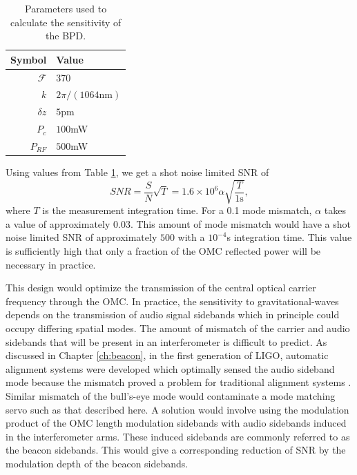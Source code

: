 \begin{table}
  \begin{center}
    \begin{tabular}{|r|l|}
      \hline
      Symbol & Value \\
      \hline
      $\mathcal{F}$ &  370\\
      $k$ &  $2\pi/(1064\text{nm})$\\
      $\delta z$ &  $5$pm\\
      $P_c$ &  $100$mW \\
      $P_{RF}$ &  $500$mW \\
      \hline
    \end{tabular}
  \caption{Parameters used to calculate the sensitivity of the BPD.}
  \label{tab:values}
  \end{center}
\end{table}

Using values from Table \ref{tab:values}, we get a shot noise limited SNR of
\begin{equation}
SNR =\frac{S}{N}\sqrt{T}= 1.6\times 10^6 \alpha \sqrt{\frac{T}{1\text{s}}},
\end{equation}
where $T$ is the measurement integration time. %
For a 0.1\perc{} mode mismatch, $\alpha$ takes a value of approximately $0.03$. %
This amount of mode mismatch would have a shot noise limited SNR of approximately $500$ with a $10^{-4}$s integration time. %
This value is sufficiently high that only a fraction of the OMC reflected power will be necessary in practice.

This design would optimize the transmission of the central optical carrier frequency through the OMC. %
In practice, the sensitivity to gravitational-waves depends on the transmission of audio signal sidebands which in principle could occupy differing spatial modes. %
The amount of mismatch of the carrier and audio sidebands that will be present in an interferometer is difficult to predict. %
As discussed in Chapter \ref{ch:beacon}, in the first generation of LIGO, automatic alignment systems were developed which optimally sensed the audio sideband mode because the mismatch proved a problem for traditional alignment systems \cite{Smith-Lefebvre:11,Tobin}. %
Similar mismatch of the bull's-eye mode would contaminate a mode matching servo such as that described here. %
A solution would involve using the modulation product of the OMC length modulation sidebands with audio sidebands induced in the interferometer arms. %
These induced sidebands are commonly referred to as the beacon sidebands. %
This would give a corresponding reduction of SNR by the modulation depth of the beacon sidebands.

